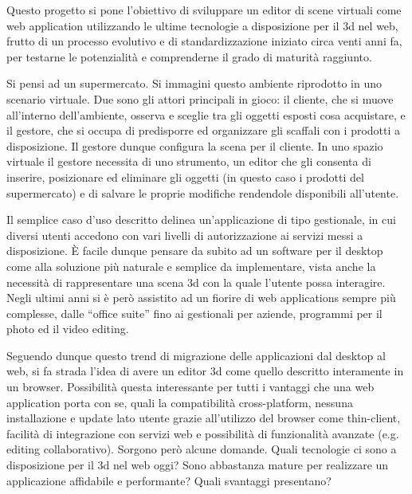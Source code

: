 Questo progetto si pone l'obiettivo di sviluppare un editor di scene virtuali come  web application utilizzando le ultime tecnologie a disposizione per il 3d nel web, frutto di un processo evolutivo e di standardizzazione iniziato circa venti anni fa, per testarne le potenzialità e comprenderne il grado di maturità raggiunto.

Si pensi ad un supermercato. Si immagini questo ambiente riprodotto in uno scenario virtuale. Due sono gli attori principali in gioco: il cliente, che si muove all'interno dell'ambiente, osserva e sceglie tra gli oggetti esposti cosa acquistare, e il gestore, che si occupa di predisporre ed organizzare gli scaffali con i prodotti a disposizione. Il gestore dunque configura la scena per il cliente. In uno spazio virtuale il gestore necessita di uno strumento, un editor che gli consenta di inserire, posizionare ed eliminare gli oggetti (in questo caso i prodotti del supermercato) e di salvare le proprie modifiche rendendole disponibili all'utente.

Il semplice caso d'uso descritto delinea un'applicazione di tipo gestionale, in cui diversi utenti accedono con vari livelli di autorizzazione ai servizi messi a disposizione. È facile dunque pensare da subito ad un software per il desktop come alla soluzione più naturale e semplice da implementare, vista anche la necessità di rappresentare una scena 3d con la quale l'utente possa interagire. Negli ultimi anni si è però assistito ad un fiorire di web applications sempre più complesse, dalle “office suite” fino ai gestionali per aziende, programmi per il photo ed il video editing.

Seguendo dunque questo trend di migrazione delle applicazioni dal desktop al web, si fa strada l'idea di avere un editor 3d come quello descritto interamente in un browser. Possibilità questa interessante per tutti i vantaggi che una web application porta con se, quali la compatibilità cross-platform, nessuna installazione e update lato utente grazie all'utilizzo del browser come thin-client, facilità di integrazione con servizi web e possibilità di funzionalità avanzate (e.g. editing collaborativo). Sorgono però alcune domande. Quali tecnologie ci sono a disposizione per il 3d nel web oggi? Sono abbastanza mature per realizzare un applicazione affidabile e performante? Quali svantaggi presentano? 

